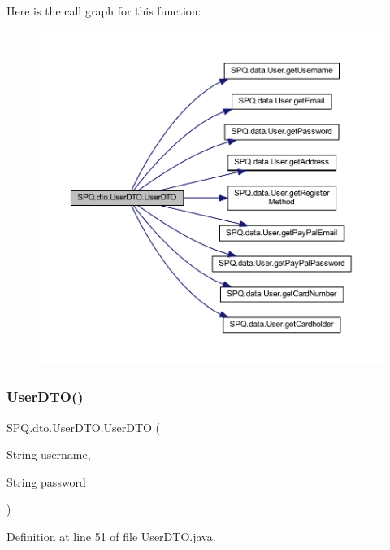 Here is the call graph for this function\+:
\nopagebreak
\begin{figure}[H]
\begin{center}
\leavevmode
\includegraphics[width=350pt]{class_s_p_q_1_1dto_1_1_user_d_t_o_a40cad7b1dea2117ed4cb0e69fdc6b929_cgraph}
\end{center}
\end{figure}
\mbox{\label{class_s_p_q_1_1dto_1_1_user_d_t_o_ad73df6daa2dd8fc4615a5b154acc229b}} 
\subsubsection{\texorpdfstring{User\+D\+T\+O()}{UserDTO()}\hspace{0.1cm}{\footnotesize\ttfamily [8/11]}}
{\footnotesize\ttfamily S\+P\+Q.\+dto.\+User\+D\+T\+O.\+User\+D\+TO (\begin{DoxyParamCaption}\item[{String}]{username,  }\item[{String}]{password }\end{DoxyParamCaption})}



Definition at line 51 of file User\+D\+T\+O.\+java.

